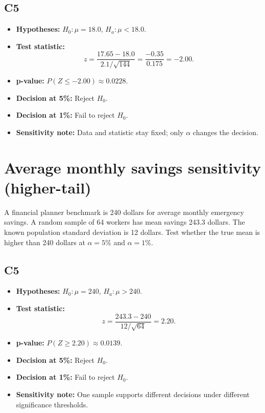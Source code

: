 \subsection*{C5}
\begin{itemize}
    \item \textbf{Hypotheses:} \(H_0\colon \mu=18.0\), \(H_a\colon \mu<18.0\).
    \item \textbf{Test statistic:}
    \[
    z=\frac{17.65-18.0}{2.1/\sqrt{144}}=\frac{-0.35}{0.175}=-2.00.
    \]
    \item \textbf{p-value:} \(P(Z\le -2.00)\approx 0.0228\).
    \item \textbf{Decision at 5\%:} Reject \(H_0\).
    \item \textbf{Decision at 1\%:} Fail to reject \(H_0\).
    \item \textbf{Sensitivity note:} Data and statistic stay fixed; only \(\alpha\) changes the decision.
\end{itemize}

\begin{center}
\hspace{0.8cm}
\end{center}


\section{Average monthly savings sensitivity (higher-tail)}
A financial planner benchmark is 240 dollars for average monthly emergency savings. A random sample of 64 workers has mean savings 243.3 dollars. The known population standard deviation is 12 dollars. Test whether the true mean is higher than 240 dollars at \(\alpha=5\%\) and \(\alpha=1\%\).

\subsection*{C5}
\begin{itemize}
    \item \textbf{Hypotheses:} \(H_0\colon \mu=240\), \(H_a\colon \mu>240\).
    \item \textbf{Test statistic:}
    \[
    z=\frac{243.3-240}{12/\sqrt{64}}=2.20.
    \]
    \item \textbf{p-value:} \(P(Z\ge 2.20)\approx 0.0139\).
    \item \textbf{Decision at 5\%:} Reject \(H_0\).
    \item \textbf{Decision at 1\%:} Fail to reject \(H_0\).
    \item \textbf{Sensitivity note:} One sample supports different decisions under different significance thresholds.
\end{itemize}

